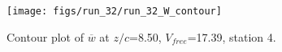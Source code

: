 \begin{figure}[H]
\centering
\texttt{[image: figs/run\_32/run\_32\_W\_contour]}
\caption{Contour plot of $\overline{w}$ at $z/c$=8.50, $V_{free}$=17.39, station 4.}
\label{fig:run_32_W_contour}
\end{figure}


